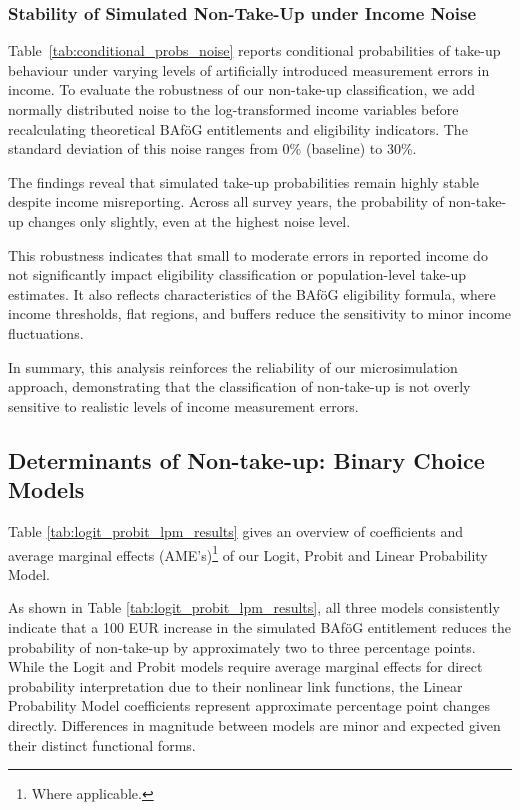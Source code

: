 \subsubsection{Stability of Simulated Non-Take-Up under Income Noise}
Table~\ref{tab:conditional_probs_noise} reports conditional probabilities of take-up behaviour under varying levels of artificially introduced measurement errors in income. 
To evaluate the robustness of our non-take-up classification, we add normally distributed noise to the log-transformed income variables before recalculating theoretical BAföG entitlements and eligibility indicators. 
The standard deviation of this noise ranges from 0\% (baseline) to 30\%.



The findings reveal that simulated take-up probabilities remain highly stable despite income misreporting. 
Across all survey years, the probability of non-take-up changes only slightly, even at the highest noise level. 

This robustness indicates that small to moderate errors in reported income do not significantly impact eligibility classification or population-level take-up estimates. 
It also reflects characteristics of the BAföG eligibility formula, where income thresholds, flat regions, and buffers reduce the sensitivity to minor income fluctuations.

In summary, this analysis reinforces the reliability of our microsimulation approach, demonstrating that the classification of non-take-up is not overly sensitive to realistic levels of income measurement errors.



\subsection{Determinants of Non-take-up: Binary Choice Models}
Table \ref{tab:logit_probit_lpm_results} gives an overview of coefficients and average marginal effects (AME's)\footnote{Where applicable.} of our Logit, Probit and Linear Probability Model.


As shown in Table \ref{tab:logit_probit_lpm_results}, all three models consistently indicate that a 100 EUR increase in the simulated BAföG entitlement reduces the probability of non-take-up by approximately two to three percentage points. 
While the Logit and Probit models require average marginal effects for direct probability interpretation due to their nonlinear link functions, the Linear Probability Model coefficients represent approximate percentage point changes directly. 
Differences in magnitude between models are minor and expected given their distinct functional forms.

